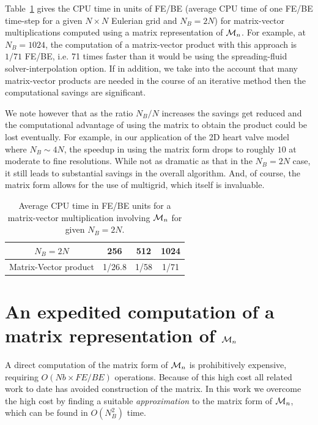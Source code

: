 Table~\ref{Table:MV} gives the CPU time in units of FE/BE (average CPU time of one FE/BE time-step for a given $N\times N$ Eulerian grid and $N_B=2N$) for matrix-vector multiplications computed using a matrix representation of  $\mathcal{M}_n$.  For example, at $N_B=1024$,  the computation of a matrix-vector product with this approach is $1/71$ FE/BE, i.e.
  71 times faster than it would be using the spreading-fluid solver-interpolation option.
  If in addition,  we take into the account that many matrix-vector products are needed in the course of an iterative method then the computational savings are significant.

We note however that as the ratio $N_B/N$ increases the savings get reduced and the computational advantage of using the matrix to obtain the product could be lost eventually. For example, in our application of the 2D heart valve model where $N_B  \sim 4N$, the speedup in using the matrix form drops to roughly $10$ at moderate to fine resolutions. While not as dramatic as that in the $N_B=2N$ case, it still leads to substantial savings in the overall algorithm. And, of course, the matrix form allows for the use of multigrid, which itself is invaluable.
  
\begin{table}
\begin{center}
\begin{tabular}{|c|c c c|}
\hline
$N_B=2N$ &  256  & 512 & 1024\\
\hline
\textrm{Matrix-Vector product} 
& 1/26.8  & 1/58 &  1/71\\
\hline
\end{tabular}
\end{center}
\caption{Average CPU time in FE/BE units for a matrix-vector multiplication involving $\mathcal{M}_n$ for given $N_B=2N$.}
\label{Table:MV}
\end{table}




\section{An expedited computation of a matrix representation of $\mathcal{M}_n$}
A direct computation of the matrix form of $\mathcal{M}_n$
is prohibitively expensive, requiring $O(Nb \times FE/BE)$ operations. Because of this high cost all related work to date has avoided construction of the matrix. In this work we overcome the high cost by finding a suitable {\em approximation} to the matrix form of $\mathcal{M}_n$, which can be found in $O(N_B^2)$ time.


